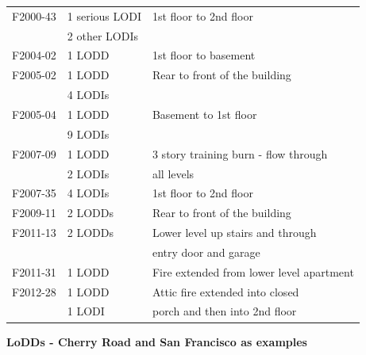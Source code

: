\documentclass[12pt,oneside]{book}
\begin{document}
\begin{table}[!ht]
\begin{tabular}{lll}
F2000-43 \cite{NIOSH:McFall3}       &  1 serious LODI     &  1st floor to 2nd floor                    \\
                                    &  2 other LODIs      &                                            \\
F2004-02 \cite{NIOSH:Berardinelli}  &  1 LODD             &  1st floor to basement                     \\
F2005-02 \cite{NIOSH:Koedam}        &  1 LODD             &  Rear to front of the building             \\
                                    &  4 LODIs            &                                            \\
F2005-04 \cite{NIOSH:McFall4}       &  1 LODD             &  Basement to 1st floor                     \\
                                    &  9 LODIs            &                                            \\
F2007-09 \cite{NIOSH:Tarley}        &  1 LODD             &  3 story training burn - flow through      \\
                                    &  2 LODIs            &  all levels                                \\
F2007-35 \cite{NIOSH:Braddee}       &  4 LODIs            &  1st floor to 2nd floor                    \\
F2009-11 \cite{NIOSH:Merinar}       &  2 LODDs            &  Rear to front of the building             \\
F2011-13 \cite{NIOSH:Bowyer2}       &  2 LODDs            &  Lower level up stairs and through         \\
                                    &                     &  entry door and garage                     \\
F2011-31 \cite{NIOSH:Loflin}        &  1 LODD             &  Fire extended from lower level apartment  \\
F2012-28 \cite{NIOSH:Bowyer}        &  1 LODD             &  Attic fire extended into closed           \\
                                    &  1 LODI             &  porch and then into 2nd floor             \\
\bottomrule
\end{tabular}
\label{tab:LODD}
\end{table}

{\bf LoDDs - Cherry Road and San Francisco as examples}
\end{document}
